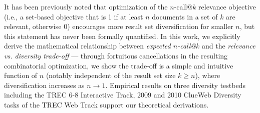 It has been previously noted that optimization of the $n$-call@$k$
relevance objective (i.e., a set-based objective that is 1 if at least
$n$ documents in a set of $k$ are relevant, otherwise 0) encourages
more result set diversification for smaller $n$, but this statement
has never been formally quantified.  In this work, we explicitly
derive the mathematical relationship between \emph{expected
$n$-call@$k$} and the \emph{relevance vs. diversity trade-off} ---
through fortuitous cancellations in the resulting combinatorial
optimization, we show the trade-off is a simple and intuitive function
of $n$ (notably independent of the result set size $k \geq n$), where
diversification increases as $n \to 1$. Empirical results on three
diversity testbeds including the TREC 6-8 Interactive Track, 2009 and
2010 ClueWeb Diversity tasks of the TREC Web Track support our
theoretical derivations.
